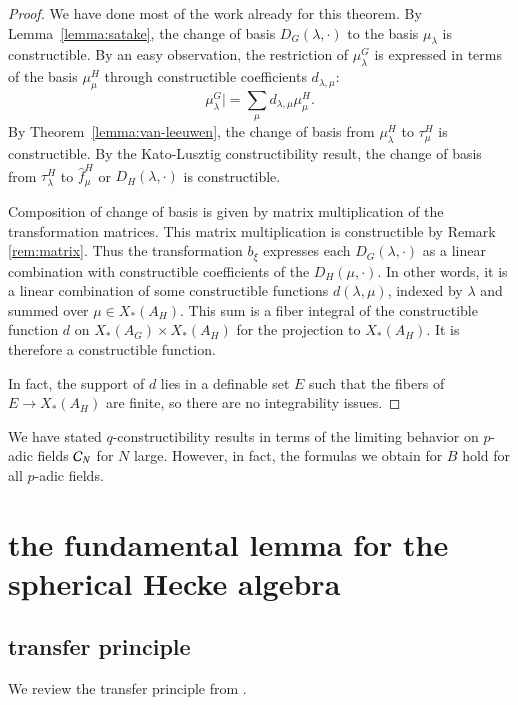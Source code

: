 \begin{proof}
We have done most of the work already for this theorem.
By Lemma~\ref{lemma:satake}, the change of basis $D_G(\lambda,\cdot)$ to the basis $\mu_\lambda$
is constructible.  By an easy observation, the restriction of $\mu^G_\lambda$ is expressed in terms of the basis $\mu^H_\mu$ through
constructible coefficients $d_{\lambda,\mu}$:
\[
\mu^G_\lambda| = \sum_{\mu} d_{\lambda,\mu} \mu^H_\mu.
\]
By Theorem~\ref{lemma:van-leeuwen}, the change of basis from $\mu^H_\lambda$ to $\tau^H_\mu$ is constructible.
By the Kato-Lusztig constructibility result, the change of basis from 
$\tau^H_\lambda$ to $\hat f^H_\mu$ or $D_H(\lambda,\cdot)$ is constructible.  

Composition of change of basis is given by matrix multiplication of the transformation matrices.
This matrix multiplication is constructible by Remark \ref{rem:matrix}.  Thus the transformation $b_\xi$
expresses each $D_G(\lambda,\cdot)$ as a linear combination with constructible coefficients
of the $D_H(\mu,\cdot)$.   In other words, it is a linear combination of some constructible functions
$d(\lambda,\mu)$, indexed by $\lambda$ and summed over $\mu\in X_*(A_H)$.  This sum
is a fiber integral of the constructible function $d$ on $X_*(A_G)\times X_*(A_H)$ for the
projection to $X_*(A_H)$.  It is therefore a constructible function.

In fact, the support of $d$ lies in a definable set $E$ such that the fibers of $E\to X_*(A_H)$
are finite, so there are no integrability issues.
\end{proof}

\begin{remark}  We have stated $q$-constructibility results in terms of the limiting behavior on
$p$-adic fields $\mathcal C_N$ for $N$ large.  However, in fact, the formulas we obtain for $B$  hold for all
$p$-adic fields.
\end{remark}

\section{the fundamental lemma for the spherical Hecke algebra}


\subsection{transfer principle}

We review the transfer principle from \cite{cluckers2010constructible}.

